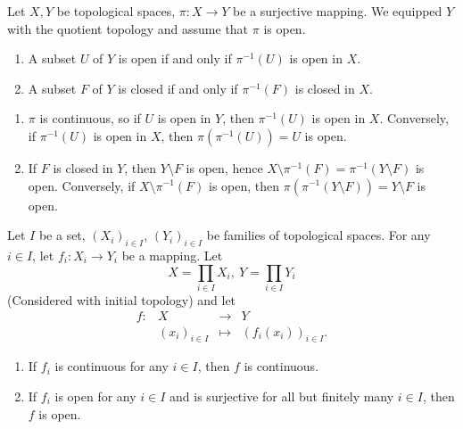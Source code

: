 \begin{propositionenv}
    Let $X,Y$ be topological spaces, $\pi : X\rightarrow Y$ be a surjective mapping.
    We equipped $Y$ with the quotient topology and assume that $\pi$ is open.
    \begin{enumerate}
        \item A subset $U$ of $Y$ is open if and only if $\pi^{-1}(U)$ is open in $X$.
        \item A subset $F$ of $Y$ is closed if and only if $\pi^{-1}(F)$ is closed in $X$.
    \end{enumerate}
\end{propositionenv}
\begin{proofenv}
    \quad 
    \begin{enumerate}
        \item $\pi$ is continuous, so if $U$ is open in $Y$, then $\pi^{-1}(U)$ is open in $X$.
        Conversely, if $\pi^{-1}(U)$ is open in $X$, then $\pi\left(\pi^{-1}(U)\right) = U$ is open.
        \item If $F$ is closed in $Y$, then $Y\setminus F$ is open, hence
        $X\setminus \pi^{-1}(F)=\pi^{-1}(Y\setminus F)$
        is open.
        Conversely, if $X\setminus \pi^{-1}(F)$ is open, then $\pi\left(\pi^{-1}\left(Y\setminus F\right)\right) = Y\setminus F$ is open.
    \end{enumerate}
\end{proofenv}
\begin{propositionenv}\label{prop:5.1.4}
    Let $I$ be a set, $\left(X_i\right)_{i\in I}$, $\left(Y_i\right)_{i\in I}$ be families of topological spaces.
    For any $i\in I$, let $f_i: X_i \rightarrow Y_i$ be a mapping.
    Let
    $$ X = \prod_{i\in I} X_i, \ Y = \prod_{i\in I} Y_i$$
    (Considered with initial topology) and let
    $$\begin{array}{rrcl}
        f : & X & \longrightarrow & Y\\
        & \left(x_i\right)_{i\in I} & \longmapsto & \left(f_i(x_i)\right)_{i\in I}.
    \end{array}$$

    \begin{enumerate}
        \item If $f_i$ is continuous for any $i\in I$, then $f$ is continuous.
        \item If $f_i$ is open for any $i\in I$ and is surjective for all but finitely many $i\in I$, then $f$ is open.
    \end{enumerate}
\end{propositionenv}
